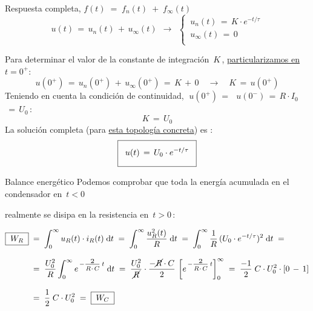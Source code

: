 \documentclass[aspectratio=169, usenames,svgnames,dvipsnames]{beamer}
\begin{document}
\begin{frame}{Respuesta completa, \hspace{3mm}$f(t) \;=\; f_n(t) \;+\; f_\infty(t)$} \label{diapo:RC_resultado}
    \begin{equation*}
        u(t) \,=\, u_n(t) \,+\, u_\infty(t) \;\,\rightarrow\;\,
        \begin{cases}
            \, u_n(t) \,=\, K \cdot e^{-t/\tau}\\[3pt]
            \, u_\infty(t) \,=\, 0\\
        \end{cases}
    \end{equation*}
    
    Para \alert{determinar} el valor de la \alert{constante de integración} $\, K \,$, \hyperlink{diapo:CondicionesIniciales}{particularizamos en \(t = 0^+\)}:
    \begin{equation*}
        u(0^+) \,=\, u_n(0^+) \,+\, u_\infty(0^+) \,=\, K \,+\, 0 \quad\rightarrow\quad K \,=\, u(0^+)
    \end{equation*}
    Teniendo en cuenta la \alert{condición de continuidad}, \(\; u(0^+) \,=\,\) \hyperlink{diapo:CondicionInicialRC}{\(\, u(0^-) \,=\, R \cdot I_0 \)} \(\,=\, U_0 \, \):
    \[
        K \,=\, U_0
    \]
    La \alert{solución completa} (para \underline{esta topología concreta}) es :
    \[
        \boxed{ \vphantom{\frac{\frac{a}{a}}{\frac{a}{a}}}\;\; u(t) \,=\, U_0 \cdot e^{-t/\tau} \;\;}
    \]
\end{frame}


\begin{frame}{Balance energético}
    Podemos comprobar que \alert{toda la energía} acumulada en el condensador en \(\, t < 0 \,\) 

    realmente \alert{se disipa} en la resistencia en \(\, t > 0 \,\):
    
    \begin{align*}
      \boxed{\; W_R \;} \;&=\; 
      \int_0^\infty u_R(t)\cdot i_R(t) \;\mathrm{d}t 
      \;=\; \int_0^\infty \frac{u_R^2(t)}{R} \;\mathrm{d}t 
      \;=\; \int_0^\infty \frac{1}{R} \, (U_0 \cdot e^{-t/\tau})^2  \;\mathrm{d}t 
      \;=\; \\[8pt]
      &=\;  \frac{U_0^2}{R} \int_0^\infty e^{\,- \frac{\vphantom{j} \scalebox{1.5} {\tiny 2}}{\vphantom{\scalebox{2} {\tiny \textit{R C}}} \scalebox{1.5} {\tiny \textit{R$\cdot$C}}}\,\scalebox{1.5} {\tiny \textit{t}} }  \;\mathrm{d}t 
      \;=\;
      \frac{U_0^2}{\cancel{R}} \cdot \frac{-\cancel{R}\cdot C}{2} \, \left[ e^{\,- \frac{\vphantom{j} \scalebox{1.5} {\tiny 2}}{\vphantom{\scalebox{2} {\tiny \textit{R C}}} \scalebox{1.5} {\tiny \textit{R$\cdot$C}}}\,\scalebox{1.5} {\tiny \textit{t}} } \right]^{\infty}_0
      \;=\; 
      \frac{-1}{2} \; C \cdot U_0^2 \cdot [0 \,-\, 1]
      \\[8pt]
      &=\; \frac{1}{2} \; C \cdot U_0^2 \;=\; \boxed{\; W_C \;}  
    \end{align*}
\end{frame}
\end{document}
